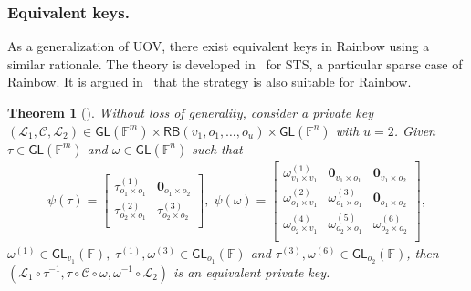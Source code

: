 \documentclass[12pt, a4paper, oneside]{memoir}
\newtheorem{theorem}{Theorem}[section]
\theoremstyle{definition}
\begin{document}
\subsubsection{Equivalent keys.}

As a generalization of UOV, there exist equivalent keys in Rainbow using a similar rationale. The theory is developed in~\cite[Sec.~4.4]{Wolf:201104} for STS, a particular sparse case of Rainbow. It is argued in~\cite{Petzoldt:201307} that the strategy is also suitable for Rainbow.

\begin{theorem}[{\cite[Thm.~4.17]{Wolf:201104}}]
  Without loss of generality, consider a private key $(\mathcal{L}_{1}, \mathcal{C}, \mathcal{L}_{2}) \in \mathsf{GL}(\mathbb{F}^{m}) \times \mathsf{RB}(v_{1}, o_{1}, \dots, o_{u}) \times \mathsf{GL}(\mathbb{F}^{n})$ with $u = 2$. Given $\tau \in \mathsf{GL}(\mathbb{F}^{m})$ and $\omega \in \mathsf{GL}(\mathbb{F}^{n})$ such that
  \begin{align}
    \psi(\tau) =
    \begin{bmatrix}
      \tau_{o_{1} \times o_{1}}^{(1)} & \mathbf{0}_{o_{1} \times o_{2}} \\
      \tau_{o_{2} \times o_{1}}^{(2)} & \tau_{o_{2} \times o_{2}}^{(3)} \\
    \end{bmatrix},\;
    \psi(\omega) =
    \begin{bmatrix}
      \omega_{v_{1} \times v_{1}}^{(1)} & \mathbf{0}_{v_{1} \times o_{1}}   & \mathbf{0}_{v_{1} \times o_{2}} \\
      \omega_{o_{1} \times v_{1}}^{(2)} & \omega_{o_{1} \times o_{1}}^{(3)} & \mathbf{0}_{o_{1} \times o_{2}} \\
      \omega_{o_{2} \times v_{1}}^{(4)} & \omega_{o_{2} \times o_{1}}^{(5)} & \omega_{o_{2} \times o_{2}}^{(6)} \\
    \end{bmatrix},
  \end{align}
  $\omega^{(1)} \in \mathsf{GL}_{v_{1}}(\mathbb{F}),\; \tau^{(1)}, \omega^{(3)} \in \mathsf{GL}_{o_{1}}(\mathbb{F})$ and $\tau^{(3)}, \omega^{(6)} \in \mathsf{GL}_{o_{2}}(\mathbb{F})$, then $(\mathcal{L}_{1} \circ \tau^{-1}, \tau \circ \mathcal{C} \circ \omega, \omega^{-1} \circ \mathcal{L}_{2})$ is an equivalent private key.
\end{theorem}
\end{document}
